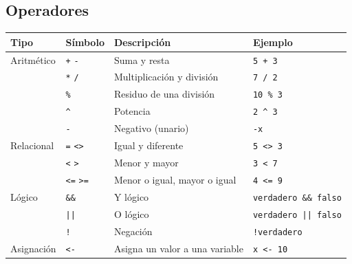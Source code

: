 \documentclass[spanish,11pt,letterpaper]{article}
\begin{document}
	\subsection{Operadores}
	\begin{center}
		\begin{tabular}{@{}llll@{}}
			\toprule
			\textbf{Tipo} & \textbf{S\'imbolo} & \textbf{Descripci\'on} & \textbf{Ejemplo} \\
			\midrule
			Aritm\'etico & \texttt{+} \; \texttt{-} & Suma y resta & \texttt{5 + 3} \\
			& \texttt{*} \; \texttt{/} & Multiplicaci\'on y divisi\'on & \texttt{7 / 2} \\
			& \texttt{\%} & Residuo de una divisi\'on & \texttt{10 \% 3} \\
			& \texttt{\textasciicircum} & Potencia & \texttt{2 \textasciicircum{} 3} \\
			& \texttt{-} & Negativo (unario) & \texttt{-x} \\
			Relacional & \texttt{=} \; \texttt{<>} & Igual y diferente & \texttt{5 <> 3} \\
			& \texttt{<} \; \texttt{>} & Menor y mayor & \texttt{3 < 7} \\
			& \texttt{<=} \; \texttt{>=} & Menor o igual, mayor o igual & \texttt{4 <= 9} \\
			L\'ogico & \texttt{\&\&} & Y l\'ogico & \texttt{verdadero \&\& falso} \\
			& \texttt{||} & O l\'ogico & \texttt{verdadero || falso} \\
			& \texttt{!} & Negaci\'on & \texttt{!verdadero} \\
			Asignaci\'on & \texttt{<-} & Asigna un valor a una variable & \texttt{x <- 10} \\
			\bottomrule
		\end{tabular}
	\end{center}
	
\end{document}
